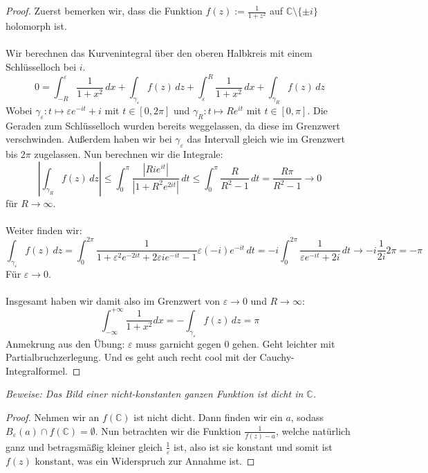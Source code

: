 \documentclass[11pt]{article}
\newcommand{\C}{\mathbb{C}}
\newenvironment{problem}[2][Beispiel]{
    \begin{trivlist}
        \item[\hskip \labelsep {\bfseries #1}\hskip \labelsep {\bfseries #2.}] \itshape}{
    \end{trivlist}\normalshape
}
\begin{document}
    \begin{proof}
        Zuerst bemerken wir, dass die Funktion $f(z) := \frac{1}{1+z^2}$ auf $\C\setminus\{\pm i\}$
        holomorph ist. \\\\
        Wir berechnen das Kurvenintegral über den oberen Halbkreis mit einem Schlüsselloch bei $i$.
        $$0 = \int_{-R}^{\varepsilon} \frac{1}{1+x^2}\, dx + \int_{\gamma_{\varepsilon}} f(z)\,dz +
        \int_{\varepsilon}^R \frac{1}{1+x^2}\, dx + \int_{\gamma_{R}} f(z)\,dz$$
        Wobei $\gamma_{\varepsilon}: t\mapsto \varepsilon e^{-it}+i$ mit $t\in [0,2\pi]$ und
        $\gamma_{R}: t\mapsto R e^{it}$ mit $t\in [0,\pi]$. Die Geraden zum Schlüsselloch wurden bereits
        weggelassen, da diese im Grenzwert verschwinden. Außerdem haben wir bei $\gamma_{\varepsilon}$
        das Intervall gleich wie im Grenzwert bis $2\pi$ zugelassen. Nun berechnen wir die Integrale:
        $$\left|\int_{\gamma_{R}} f(z)\,dz\right|\leq \int_{0}^\pi \frac{|Rie^{it}|}{|1+R^2 e^{2it}|}
        \,dt\leq \int_{0}^\pi \frac{R}{R^2-1}\,dt= \frac{R\pi}{R^2-1} \to 0$$
        für $R\to\infty$. \\\\
        Weiter finden wir:
        $$\int_{\gamma_{\varepsilon}} f(z)\,dz = \int_{0}^{2\pi}\frac{1}{1+\varepsilon^2 e^{-2it} +
        2\varepsilon i e^{-it} -1}\varepsilon(-i)e^{-it}\,dt =-i\int_{0}^{2\pi}\frac{1}{\varepsilon e^{-it} +
        2i}\,dt \to -i\frac{1}{2i}2\pi = -\pi $$
        Für $\varepsilon\to 0$.\\\\
        Insgesamt haben wir damit also im Grenzwert von $\varepsilon\to 0$ und $R\to\infty$:
        $$\int_{-\infty}^{+\infty} \frac{1}{1+x^2} d x = - \int_{\gamma_{\varepsilon}} f(z)\,dz = \pi$$
        Anmekrung aus den Übung: $\varepsilon$ muss garnicht gegen $0$ gehen. Geht leichter
        mit Partialbruchzerlegung. Und es geht auch recht cool mit der Cauchy-Integralformel.
    \end{proof}

    \begin{problem}{3}
        Beweise: Das Bild einer nicht-konstanten ganzen Funktion ist dicht in $\mathbb{C}$.
    \end{problem}

    \begin{proof}
        Nehmen wir an $f(\C)$ ist nicht dicht. Dann finden wir ein $a$, sodass $B_\varepsilon (a)\cap f(\C) =
        \emptyset$. Nun betrachten wir die Funktion $\frac{1}{f(z)-a}$, welche natürlich ganz und
        betragsmäßig kleiner gleich $\frac{1}{\varepsilon}$ ist, also ist sie konstant und somit ist $f(z)$
        konstant, was ein Widerspruch zur Annahme ist.
    \end{proof}
\end{document}
